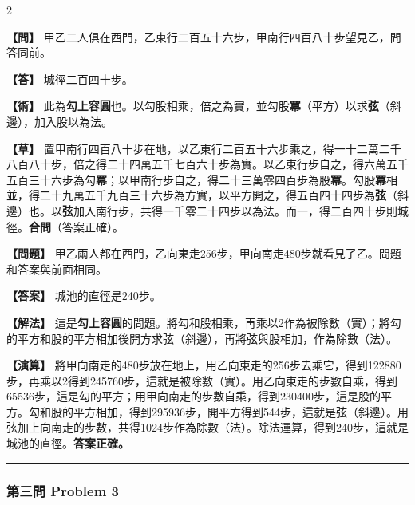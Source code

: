 \documentclass[11pt,a4paper]{article}
\newcommand{\wen}[1]{\par\noindent\textbf{\color{problemcolor}【問】} #1\par}
\newcommand{\da}[1]{\par\noindent\textbf{\color{problemcolor}【答】} #1\par}
\newcommand{\shu}[1]{\par\noindent\textbf{\color{problemcolor}【術】} #1\par}
\newcommand{\cao}[1]{\par\noindent\textbf{\color{problemcolor}【草】} #1\par}
\newcommand{\wenm}[1]{\par\noindent\textbf{\color{problemcolor}【問題】} #1\par}
\newcommand{\dam}[1]{\par\noindent\textbf{\color{problemcolor}【答案】} #1\par}
\newcommand{\shum}[1]{\par\noindent\textbf{\color{problemcolor}【解法】} #1\par}
\newcommand{\caom}[1]{\par\noindent\textbf{\color{problemcolor}【演算】} #1\par}
\begin{document}
\begin{paracol}{2}
\wen{甲乙二人俱在西門，乙東行二百五十六步，甲南行四百八十步望見乙，問答同前。}

\da{城徑二百四十步。}

\shu{此為\textbf{勾上容圓}也。以勾股相乘，倍之為實，並勾股\textbf{冪}（平方）以求\textbf{弦}（斜邊），加入股以為法。}

\cao{置甲南行四百八十步在地，以乙東行二百五十六步乘之，得一十二萬二千八百八十步，倍之得二十四萬五千七百六十步為實。以乙東行步自之，得六萬五千五百三十六步為勾\textbf{冪}；以甲南行步自之，得二十三萬零四百步為股\textbf{冪}。勾股\textbf{冪}相並，得二十九萬五千九百三十六步為方實，以平方開之，得五百四十四步為\textbf{弦}（斜邊）也。以\textbf{弦}加入南行步，共得一千零二十四步以為法。而一，得二百四十步則城徑。\textbf{合問}（答案正確）。}

\switchcolumn
\wenm{甲乙兩人都在西門，乙向東走256步，甲向南走480步就看見了乙。問題和答案與前面相同。}

\dam{城池的直徑是240步。}

\shum{這是\textbf{勾上容圓}的問題。將勾和股相乘，再乘以2作為被除數（實）；將勾的平方和股的平方相加後開方求弦（斜邊），再將弦與股相加，作為除數（法）。}

\caom{將甲向南走的480步放在地上，用乙向東走的256步去乘它，得到122880步，再乘以2得到245760步，這就是被除數（實）。用乙向東走的步數自乘，得到65536步，這是勾的平方；用甲向南走的步數自乘，得到230400步，這是股的平方。勾和股的平方相加，得到295936步，開平方得到544步，這就是弦（斜邊）。用弦加上向南走的步數，共得1024步作為除數（法）。除法運算，得到240步，這就是城池的直徑。\textbf{答案正確。}}
\end{paracol}

\vspace{0.5cm}
\noindent\textcolor{rulecolor}{\rule{\textwidth}{0.4pt}}

\subsubsection*{第三問 \quad Problem 3}
\end{document}
